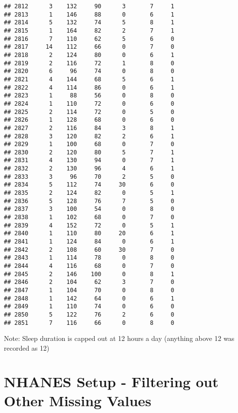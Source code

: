 \documentclass[
]{article}
\begin{document}
\begin{verbatim}
## 2812      3    132     90      3       7     1
## 2813      1    146     88      0       6     1
## 2814      5    132     74      5       8     1
## 2815      1    164     82      2       7     1
## 2816      7    110     62      5       6     0
## 2817     14    112     66      0       7     0
## 2818      2    124     80      0       6     1
## 2819      2    116     72      1       8     0
## 2820      6     96     74      0       8     0
## 2821      4    144     68      5       6     1
## 2822      4    114     86      0       6     1
## 2823      1     88     56      0       8     0
## 2824      1    110     72      0       6     0
## 2825      2    114     72      0       5     0
## 2826      1    128     68      0       6     0
## 2827      2    116     84      3       8     1
## 2828      3    120     82      2       6     1
## 2829      1    100     68      0       7     0
## 2830      2    120     80      5       7     1
## 2831      4    130     94      0       7     1
## 2832      2    130     96      4       6     1
## 2833      3     96     70      2       5     0
## 2834      5    112     74     30       6     0
## 2835      2    124     82      0       5     1
## 2836      5    128     76      7       5     0
## 2837      3    100     54      0       8     0
## 2838      1    102     68      0       7     0
## 2839      4    152     72      0       5     1
## 2840      1    110     80     20       6     1
## 2841      1    124     84      0       6     1
## 2842      2    108     60     30       7     0
## 2843      1    114     78      0       8     0
## 2844      4    116     68      0       7     0
## 2845      2    146    100      0       8     1
## 2846      2    104     62      3       7     0
## 2847      1    104     70      0       8     0
## 2848      1    142     64      0       6     1
## 2849      1    110     74      0       6     0
## 2850      5    122     76      2       6     0
## 2851      7    116     66      0       8     0
\end{verbatim}

Note: Sleep duration is capped out at 12 hours a day (anything above 12
was recorded as 12)

\section{NHANES Setup - Filtering out Other Missing
Values}\label{nhanes-setup---filtering-out-other-missing-values}
\end{document}
